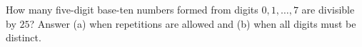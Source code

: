 How many five-digit base-ten numbers formed from digits $0,1,\ldots,7$ are divisible by $25$? Answer (a) when repetitions are allowed and (b) when all digits must be distinct.
